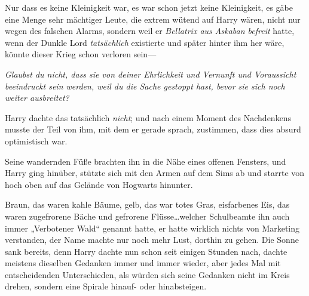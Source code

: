 Nur dass es keine Kleinigkeit war, es war schon jetzt keine Kleinigkeit, es gäbe eine Menge sehr mächtiger Leute, die extrem wütend auf Harry wären, nicht nur wegen des falschen Alarms, sondern weil er \emph{Bellatrix aus Askaban befreit} hatte, wenn der Dunkle Lord \emph{tatsächlich} existierte und später hinter ihm her wäre, könnte dieser Krieg schon verloren sein—

\emph{Glaubst du nicht, dass sie von deiner Ehrlichkeit und Vernunft und Voraussicht beeindruckt sein werden, weil du die Sache gestoppt hast, bevor sie sich noch weiter ausbreitet?}

Harry dachte das tatsächlich \emph{nicht}; und nach einem Moment des Nachdenkens musste der Teil von ihm, mit dem er gerade sprach, zustimmen, dass dies absurd optimistisch war.

Seine wandernden Füße brachten ihn in die Nähe eines offenen Fensters, und Harry ging hinüber, stützte sich mit den Armen auf dem Sims ab und starrte von hoch oben auf das Gelände von Hogwarts hinunter.

Braun, das waren kahle Bäume, gelb, das war totes Gras, eisfarbenes Eis, das waren zugefrorene Bäche und gefrorene Flüsse…welcher Schulbeamte ihn auch immer „Verbotener Wald“ genannt hatte, er hatte wirklich nichts von Marketing verstanden, der Name machte nur noch mehr Lust, dorthin zu gehen. Die Sonne sank bereits, denn Harry dachte nun schon seit einigen Stunden nach, dachte meistens dieselben Gedanken immer und immer wieder, aber jedes Mal mit entscheidenden Unterschieden, als würden sich seine Gedanken nicht im Kreis drehen, sondern eine Spirale hinauf- oder hinabsteigen.

